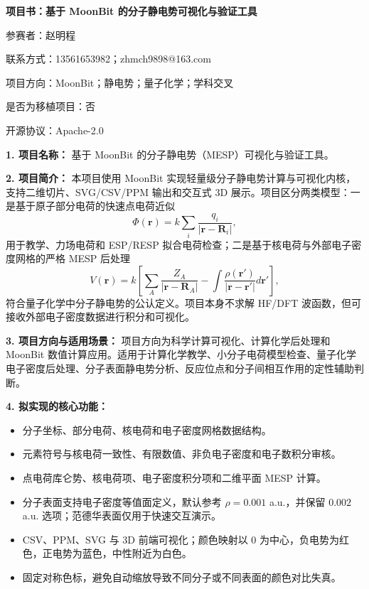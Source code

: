 \documentclass[10pt,a4paper]{ctexart}
\begin{document}
\begin{center}
{\large\bfseries 项目书：基于 MoonBit 的分子静电势可视化与验证工具}
\end{center}
\begin{center}

参赛者：赵明程

联系方式：13561653982；zhmch9898@163.com  

项目方向：MoonBit；静电势；量子化学；学科交叉

是否为移植项目：否

开源协议：Apache-2.0

\end{center}
\textbf{1. 项目名称：}
基于 MoonBit 的分子静电势（MESP）可视化与验证工具。

\textbf{2. 项目简介：}
本项目使用 MoonBit 实现轻量级分子静电势计算与可视化内核，支持二维切片、SVG/CSV/PPM 输出和交互式 3D 展示。项目区分两类模型：一是基于原子部分电荷的快速点电荷近似
\[
\Phi(\mathbf r)=k\sum_i\frac{q_i}{|\mathbf r-\mathbf R_i|},
\]
用于教学、力场电荷和 ESP/RESP 拟合电荷检查；二是基于核电荷与外部电子密度网格的严格 MESP 后处理
\[
V(\mathbf r)=k\left[\sum_A\frac{Z_A}{|\mathbf r-\mathbf R_A|}
-\int\frac{\rho(\mathbf r')}{|\mathbf r-\mathbf r'|}d\mathbf r'\right],
\]
符合量子化学中分子静电势的公认定义。项目本身不求解 HF/DFT 波函数，但可接收外部电子密度数据进行积分和可视化。

\textbf{3. 项目方向与适用场景：}
项目方向为科学计算可视化、计算化学后处理和 MoonBit 数值计算应用。适用于计算化学教学、小分子电荷模型检查、量子化学电子密度后处理、分子表面静电势分析、反应位点和分子间相互作用的定性辅助判断。

\textbf{4. 拟实现的核心功能：}
\begin{itemize}
  \item 分子坐标、部分电荷、核电荷和电子密度网格数据结构。
  \item 元素符号与核电荷一致性、有限数值、非负电子密度和电子数积分审核。
  \item 点电荷库仑势、核电荷项、电子密度积分项和二维平面 MESP 计算。
  \item 分子表面支持电子密度等值面定义，默认参考 $\rho=0.001$ a.u.，并保留 $0.002$ a.u. 选项；范德华表面仅用于快速交互演示。
  \item CSV、PPM、SVG 与 3D 前端可视化；颜色映射以 0 为中心，负电势为红色，正电势为蓝色，中性附近为白色。
  \item 固定对称色标，避免自动缩放导致不同分子或不同表面的颜色对比失真。
\end{itemize}
\end{document}
